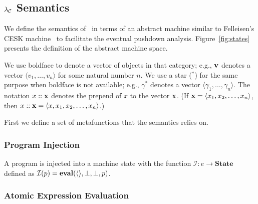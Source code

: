 \newcommand{\clo}[2]{\nttwo{clos}{#1}{#2}}
\newcommand{\imp}[2]{\ntthr{imp}{\ell}{#1}{#2}}
\newcommand{\cha}[2]{\ntthr{chap}{\ell}{#1}{#2}}

\newcommand{\letk}[3]{\ntthr{let}{#1}{#2}{#3}}

\newcommand{\impcwk}[2]{\ntthr{imp\mhyphen neg}{\ell}{#1}{#2}}
\newcommand{\impcfk}[1]{\nttwo{imp\mhyphen fun}{\ell}{#1}}
\newcommand{\impcrk}[1]{\nttwo{imp\mhyphen pos}{\ell}{#1}}

\newcommand{\chacwk}[2]{\ntthr{chap\mhyphen neg}{\ell}{#1}{#2}}
\newcommand{\chacfk}[1]{\nttwo{chap\mhyphen fun}{\ell}{#1}}
\newcommand{\chacrk}[1]{\nttwo{chap\mhyphen pos}{\ell}{#1}}

\newcommand{\rr}{\longrightarrow}
\newcommand{\rrs}{\longrightarrow^{*}}

\subsection{$\lambda_{\mathcal{C}}$ Semantics}

We define the semantics of \chapcalc\ in terms of an abstract machine similar to Felleisen's CESK machine~\cite{felleisen1987calculus} to facilitate the eventual pushdown analysis.
Figure~\ref{fig:states} presents the definition of the abstract machine space.

We use boldface to denote a vector of objects in that category; e.g., $\mathbf{v}$ denotes a vector $\langle v_1,\dots,v_n\rangle$ for some natural number $n$.
We use a star ($^*$) for the same purpose when boldface is not available; e.g., $\gamma^*$ denotes a vector $\langle\gamma_1,\dots,\gamma_n\rangle$.
The notation $x::\mathbf{x}$ denotes the prepend of $x$ to the vector $\mathbf{x}$.
(If $\mathbf{x}=\langle x_1,x_2,\dots,x_n\rangle$, then $x::\mathbf{x}=\langle x,x_1,x_2,\dots,x_n\rangle$.)

First we define a set of metafunctions that the semantics relies on.

\subsubsection{Program Injection}

A program is injected into a machine state with the function $\mathcal{I} : e\rightarrow\mathbf{State}$ defined as $\mathcal{I}(p)=\mathbf{eval}(\langle\rangle,\perp,\perp,p)$.

\subsubsection{Atomic Expression Evaluation}

